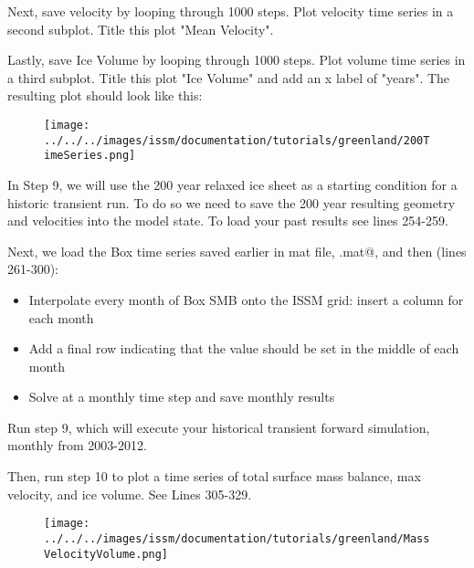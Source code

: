 Next, save velocity by looping through 1000 steps. Plot velocity time series in a second subplot. Title this plot "Mean Velocity".

Lastly, save Ice Volume by looping through 1000 steps. Plot volume time series in a third subplot. Title this plot "Ice Volume" and add an x label of "years". The resulting plot should look like this:

\begin{figure}[H]
	\begin{center}
		\texttt{[image: ../../../images/issm/documentation/tutorials/greenland/200TimeSeries.png]}
	\end{center}
\end{figure}

In Step 9, we will use the 200 year relaxed ice sheet as a starting condition for a historic transient run. To do so we need to save the 200 year resulting geometry and velocities into the model state. To load your past results see lines 254-259.

Next, we load the Box time series saved earlier in mat file, \verb@smbbox.mat@, and then (lines 261-300):
\begin{itemize}
	\item Interpolate every month of Box SMB onto the ISSM grid: insert a column for each month
	\item Add a final row indicating that the value should be set in the middle of each month
	\item Solve at a monthly time step and save monthly results
\end{itemize}

Run step 9, which will execute your historical transient forward simulation, monthly from 2003-2012.

Then, run step 10 to plot a time series of total surface mass balance, max velocity, and ice volume. See Lines 305-329.

\begin{figure}[H]
	\begin{center}
		\texttt{[image: ../../../images/issm/documentation/tutorials/greenland/MassVelocityVolume.png]}
	\end{center}
\end{figure}

